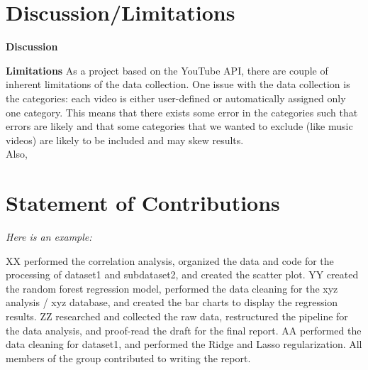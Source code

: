 \documentclass{article}
\begin{document}
\section{Discussion/Limitations}
\textbf{Discussion }

\textbf{Limitations } As a project based on the YouTube API, there are couple of inherent limitations of the data collection. One issue with the data collection is the categories: each video is either user-defined or automatically assigned only one category. This means that there exists some error in the categories such that errors are likely and that some categories that we wanted to exclude (like music videos) are likely to be included and may skew results. \\
Also, 


\section{Statement of Contributions}

\emph{Here is an example:}

XX performed the correlation analysis, organized the data and code for the processing of dataset1 and subdataset2, and created the scatter plot. 
YY created the random forest regression model, performed the data cleaning for the xyz analysis / xyz database, and created the bar charts to display the regression results. 
ZZ researched and collected the raw data, restructured the pipeline for the data analysis, and proof-read the draft for the final report. 
AA performed the data cleaning for dataset1, and performed the Ridge and Lasso regularization. 
All members of the group contributed to writing the report.




\end{document}
